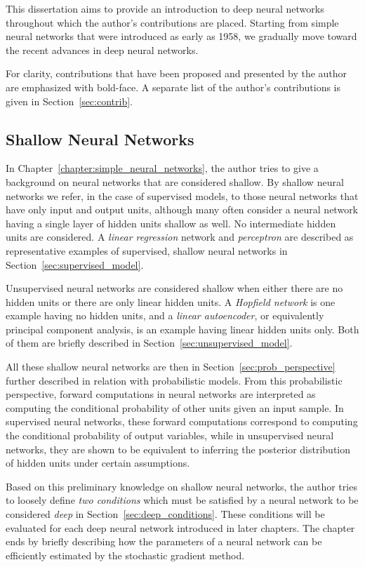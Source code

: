 \documentclass[dissertation,nocontribution,draft*]{aaltoseries}
\begin{document}
This dissertation aims to provide an introduction to deep
neural networks throughout which the author's contributions
are placed. Starting from simple neural networks that were
introduced as early as 1958, we gradually move toward the
recent advances in deep neural networks. 

For clarity, contributions that have been proposed and presented by
the author are emphasized with bold-face. A separate list of
the author's contributions is given in
Section~\ref{sec:contrib}.

\subsection{Shallow Neural Networks}

In Chapter~\ref{chapter:simple_neural_networks}, the author
tries to give a background on neural networks that are
considered shallow. By shallow neural networks we refer, in
the case of supervised models, to those neural networks that
have only input and output units, although many often
consider a neural network having a single layer of hidden
units shallow as well. No intermediate hidden units are
considered. A \textit{linear regression} network and
\textit{perceptron} are described as representative examples
of supervised, shallow neural networks in
Section~\ref{sec:supervised_model}.

Unsupervised neural networks are considered shallow when
either there are no hidden units or there are only linear
hidden units. A \textit{Hopfield network} is one example 
having no hidden units, and a \textit{linear autoencoder},
or equivalently principal component analysis, is an example
having linear hidden units only. Both of them are briefly
described in Section~\ref{sec:unsupervised_model}.

All these shallow neural networks are then in
Section~\ref{sec:prob_perspective} further described in
relation with probabilistic models. From this probabilistic
perspective, forward computations in neural networks are
interpreted as computing the conditional probability of other
units given an input sample. In supervised neural networks,
these forward computations correspond to computing the
conditional probability of output variables, while in
unsupervised neural networks, they are shown to be
equivalent to inferring the posterior distribution of hidden
units under certain assumptions.

Based on this preliminary knowledge on shallow neural
networks, the author tries to loosely define \textit{two
conditions} which must be satisfied by a neural network to
be considered \textit{deep} in
Section~\ref{sec:deep_conditions}. These conditions will be
evaluated for each deep neural network introduced in later
chapters. The chapter ends by briefly describing how the
parameters of a neural network can be efficiently estimated
by the stochastic gradient method.
\end{document}
